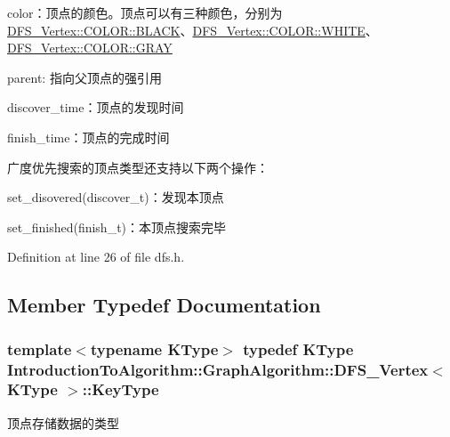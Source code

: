 \begin{DoxyItemize}
\item {\ttfamily color}：顶点的颜色。顶点可以有三种颜色，分别为{\ttfamily \hyperlink{struct_introduction_to_algorithm_1_1_graph_algorithm_1_1_d_f_s___vertex_a9455444fdfb1b29f24c1d27e74e7c124a08d0012388564e95c3b4a7407cf04965}{D\+F\+S\+\_\+\+Vertex\+::\+C\+O\+L\+O\+R\+::\+B\+L\+A\+C\+K}}、{\ttfamily \hyperlink{struct_introduction_to_algorithm_1_1_graph_algorithm_1_1_d_f_s___vertex_a9455444fdfb1b29f24c1d27e74e7c124ab5bf627e448384cf3a4c35121ca6008d}{D\+F\+S\+\_\+\+Vertex\+::\+C\+O\+L\+O\+R\+::\+W\+H\+I\+T\+E}}、{\ttfamily \hyperlink{struct_introduction_to_algorithm_1_1_graph_algorithm_1_1_d_f_s___vertex_a9455444fdfb1b29f24c1d27e74e7c124a48bf014c704c9eaae100a98006a37bf7}{D\+F\+S\+\_\+\+Vertex\+::\+C\+O\+L\+O\+R\+::\+G\+R\+A\+Y}}
\item {\ttfamily parent}\+: 指向父顶点的强引用
\item {\ttfamily discover\+\_\+time}：顶点的发现时间
\item {\ttfamily finish\+\_\+time}：顶点的完成时间
\end{DoxyItemize}

广度优先搜索的顶点类型还支持以下两个操作：


\begin{DoxyItemize}
\item {\ttfamily set\+\_\+disovered(discover\+\_\+t)}：发现本顶点
\item {\ttfamily set\+\_\+finished(finish\+\_\+t)}：本顶点搜索完毕 
\end{DoxyItemize}

Definition at line 26 of file dfs.\+h.



\subsection{Member Typedef Documentation}
\hypertarget{struct_introduction_to_algorithm_1_1_graph_algorithm_1_1_d_f_s___vertex_ab53cda3a7d135ed892b298c14d5579fe}{}
\subsubsection[{Key\+Type}]{\setlength{\rightskip}{0pt plus 5cm}template$<$typename K\+Type$>$ typedef K\+Type {\bf Introduction\+To\+Algorithm\+::\+Graph\+Algorithm\+::\+D\+F\+S\+\_\+\+Vertex}$<$ K\+Type $>$\+::{\bf Key\+Type}}\label{struct_introduction_to_algorithm_1_1_graph_algorithm_1_1_d_f_s___vertex_ab53cda3a7d135ed892b298c14d5579fe}
顶点存储数据的类型 


